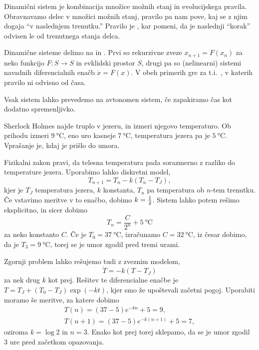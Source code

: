 
Dinamični sistem je kombinacija množice možnih stanj in evolucijskega pravila.
Obravnavamo delec v množici možnih stanj, pravilo pa nam pove, kaj se z njim
dogaja \enquote{v naslednjem trenutku.}
Pravilo je , kar pomeni, da je naslednji \enquote{korak}
odvisen le od trenutnega stanja delca.

Dinamične sisteme delimo na  in .
Prvi so rekurzivne zveze $x_{n+1} = F(x_n)$ za neko funkcijo $F: S \to S$ in
evklidski prostor $S$, drugi pa so (nelinearni) sistemi navadnih diferencialnih
enačb $\dot{x} = F(x)$.
V obeh primerih gre za t.i.~, v katerih pravilo ni
odvisno od časa.

\begin{opomba}
  Vsak sistem lahko prevedemo na avtonomen sistem, če zapakiramo čas kot dodatno
  spremenljivko.
\end{opomba}

\begin{primer}
  Sherlock Holmes najde truplo v jezeru, in izmeri njegovo temperaturo.
  Ob prihodu izmeri $\qty{9}{\celsius}$, eno uro kasneje $\qty{7}{\celsius}$,
  temperatura jezera pa je $\qty{5}{\celsius}$.
  Vprašanje je, kdaj je prišlo do umora.

  Fizikalni zakon pravi, da telesna temperatura pada sorazmerno z razliko do
  temperature jezera.
  Uporabimo lahko diskretni model,
  \[
	T_{n+1} = T_n - k (T_n - T_J),
  \]
  kjer je $T_J$ temperatura jezera, $k$ konstanta, $T_n$ pa temperatura ob
  $n$-tem trenutku.
  Če vstavimo meritve v to enačbo, dobimo $k = \frac{1}{2}$.
  Sistem lahko potem rešimo eksplicitno, in sicer dobimo
  \[
	T_n = \frac{C}{2^n} + \qty{5}{\celsius}
  \]
  za neko konstanto $C$.
  Če je $T_0 = \qty{37}{\celsius}$, izračunamo $C = \qty{32}{\celsius}$, iz
  česar dobimo, da je $T_3 = \qty{9}{\celsius}$, torej se je umor zgodil pred
  tremi urami.
  \boxdot{}
\end{primer}

\begin{primer}
  Zgornji problem lahko rešujemo tudi z zveznim modelom,
  \[
	\dot{T} = -k (T - T_J)
  \]
  za nek drug $k$ kot prej.
  Rešitev te diferencialne enačbe je $T = T_J + (T_0 - T_J) \exp(-kt)$, kjer smo
  že upoštevali začetni pogoj.
  Uporabiti moramo še meritve, za katere dobimo
  \begin{gather*}
	T(n) = (37 - 5) e^{-kn} + 5 = 9, \\
	T(n+1) = (37 - 5) e^{-k(n+1)} + 5 = 7,
  \end{gather*}
  oziroma $k = \log 2$ in $n = 3$.
  Enako kot prej torej sklepamo, da se je umor zgodil $3$ ure pred začetkom
  opazovanja.
  \boxdot{}
\end{primer}